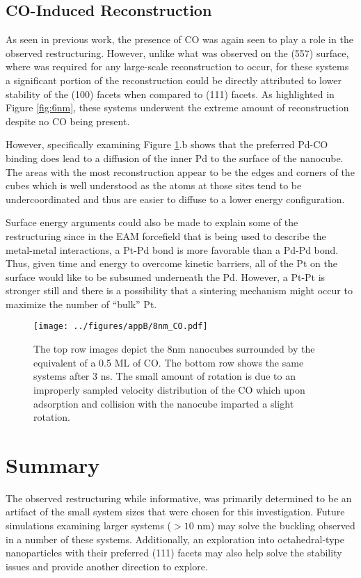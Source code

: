 \subsection{CO-Induced Reconstruction}
As seen in previous work\citep{Michalka:2013aa}, the presence of CO was again
seen to play a role in the observed restructuring. However, unlike what was
observed on the  (557) surface, where  was
required for any large-scale reconstruction to occur, for these systems a
significant portion of the reconstruction could be directly attributed to lower
stability of the (100) facets when compared to (111) facets. As highlighted in
Figure \ref{fig:6nm}, these systems underwent the extreme amount of
reconstruction despite no CO being present. 

However, specifically examining Figure \ref{fig:8nmCO}.b shows that the
preferred Pd-CO binding does lead to a diffusion of the inner Pd to the surface
of the nanocube. The areas with the most reconstruction appear to be the edges
and corners of the cubes which is well understood as the atoms at those sites
tend to be undercoordinated and thus are easier to diffuse to a lower energy
configuration. 

Surface energy arguments could also be made to explain some of the
restructuring since in the EAM forcefield that is being used to describe the
metal-metal interactions, a Pt-Pd bond is more favorable than a Pd-Pd bond.
Thus, given time and energy to overcome kinetic barriers, all of the Pt on the
surface would like to be subsumed underneath the Pd. However, a Pt-Pt is
stronger still and there is a possibility that a sintering mechanism might
occur to maximize the number of ``bulk'' Pt.


\begin{landscape}
\begin{figure}[p!]
\centering
  \texttt{[image: ../figures/appB/8nm\_CO.pdf]}
  \caption{The top row images depict the 8nm nanocubes surrounded by the
equivalent of a 0.5 ML of CO. The bottom row shows the same systems after 3 ns.
The small amount of rotation is due to an improperly sampled velocity
distribution of the CO which upon adsorption and collision with the nanocube
imparted a slight rotation.}
  \label{fig:8nmCO}
\end{figure}
\end{landscape}



\section{Summary}
The observed restructuring while informative, was primarily determined to be an
artifact of the small system sizes that were chosen for this investigation.
Future simulations examining larger systems ($>10$ nm) may solve the buckling
observed in a number of these systems. Additionally, an exploration into
octahedral-type nanoparticles with their preferred (111) facets may also help
solve the stability issues and provide another direction to explore.
